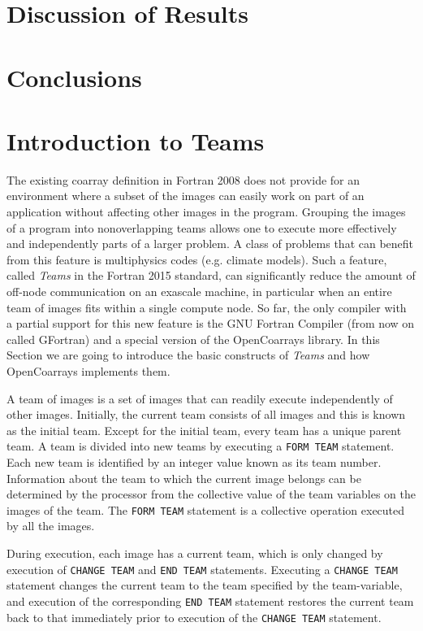 
\section{Discussion of Results}

\section{Conclusions}

\section{Introduction to Teams}\label{sec:teams}
The existing coarray definition in Fortran 2008 does not provide for an environment
where a subset of the images can easily work on part of an application without affecting
other images in the program.  Grouping the images of a program into nonoverlapping
teams allows one to execute more effectively and independently parts of a larger
problem.  A class of problems that can benefit from this feature is multiphysics codes
(e.g.  climate models).
Such a feature, called \textit{Teams} in the Fortran 2015 standard, can significantly reduce the amount of off-node
communication on an exascale machine, in particular when an entire team of images
fits within a single compute node.
So far, the only compiler with a partial support for this new feature is the GNU Fortran Compiler (from now on
called GFortran) and a special version of the OpenCoarrays library.
In this Section we are going to introduce the basic constructs of \textit{Teams} and how OpenCoarrays implements them.

A team of images is a set of images that can readily execute independently of other images.
Initially, the current team consists of all images and this is
known as the initial team. Except for the initial team, every team has a unique parent team. A team is divided
into new teams by executing a \texttt{FORM TEAM} statement.
Each new team is identified by an integer value known
as its team number. Information about the team to which the current image belongs can be determined by the
processor from the collective value of the team variables on the images of the team.
The \texttt{FORM TEAM} statement is a collective operation executed by all the images.

During execution, each image has a current team, which is only changed by execution of \texttt{CHANGE TEAM} and
\texttt{END TEAM} statements. Executing a \texttt{CHANGE TEAM} statement changes the current team to the team specified
by the team-variable, and execution of the corresponding \texttt{END TEAM} statement restores the current team back
to that immediately prior to execution of the \texttt{CHANGE TEAM} statement.

